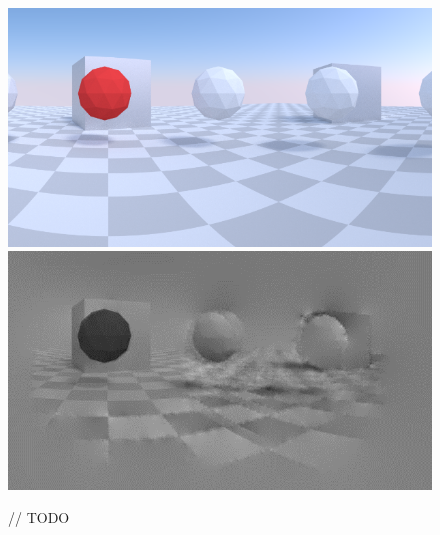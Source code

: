 \begin{figure}
\label{fig:zigzag_reconstruction}
\includegraphics[width=\columnwidth]{images/zigzag_input.png}
\includegraphics[width=\columnwidth]{images/zigzag_reconstruction.png}
\caption{// TODO}
\end{figure}